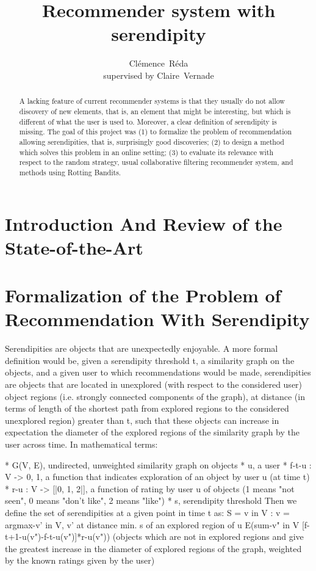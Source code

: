 \documentclass{article}
\title{Recommender system with serendipity}
\author{
  Cl\'{e}mence~R\'{e}da\\
  supervised by Claire~Vernade\\
}
\begin{document}
\nocite{*}

\maketitle

\begin{abstract}
A lacking feature of current recommender systems is that they usually do not allow discovery of new elements, that is, an element that might be interesting, but which is different of what the user is used to. Moreover, a clear definition of serendipity is missing. The goal of this project was (1) to formalize the problem of recommendation allowing serendipities, that is, surprisingly good discoveries; (2) to design a method which solves this problem in an online setting; (3) to evaluate its relevance with respect to the random strategy, usual collaborative filtering recommender system, and methods using Rotting Bandits.
\end{abstract}

\section{Introduction And Review of the State-of-the-Art}


\section{Formalization of the Problem of Recommendation With Serendipity}

Serendipities are objects that are unexpectedly enjoyable. A more formal definition would be, given a serendipity threshold t, a similarity graph on the objects, and a given user to which recommendations would be made, serendipities are objects that are located in unexplored (with respect to the considered user) object regions (i.e. strongly connected components of the graph), at distance (in terms of length of the shortest path from explored regions to the considered unexplored region) greater than t, such that these objects can increase in expectation the diameter of the explored regions of the similarity graph by the user across time. In mathematical terms:

* G(V, E), undirected, unweighted similarity graph on objects
* u, a user 
* f-t-u : V -> {0, 1}, a function that indicates exploration of an object by user u (at time t)
* r-u : V -> [|0, 1, 2|], a function of rating by user u of objects (1 means "not seen", 0 means "don't like", 2 means "like")
* s, serendipity threshold
Then we define the set of serendipities at a given point in time t as:
S = {v in V : v = argmax-{v' in V, v' at distance min. s of an explored region of u} E(sum-{v" in V} [f-{t+1}-u(v")-f-{t}-u(v")]*r-u(v"))}
(objects which are not in explored regions and give the greatest increase in the diameter of explored regions of the graph, weighted by the known ratings given by the user)
\end{document}
